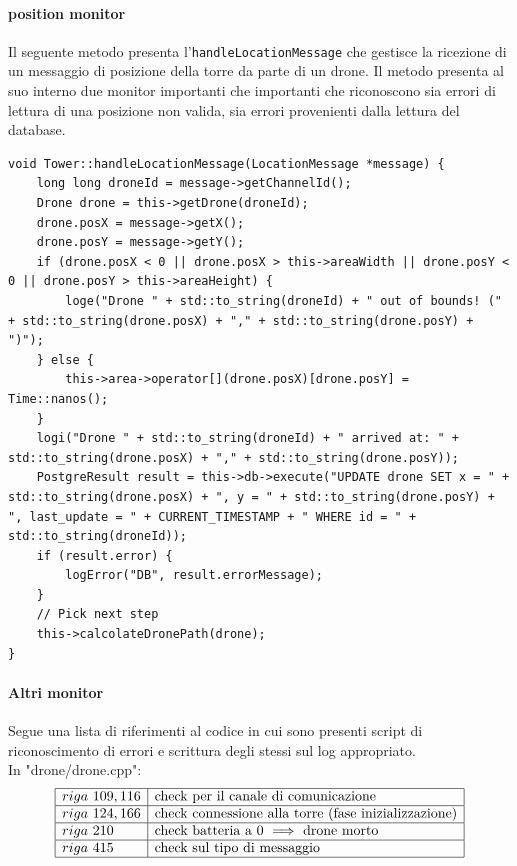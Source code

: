 \documentclass[a4paper, 11pt]{article}
\begin{document}
\paragraph*{position monitor} Il seguente metodo presenta l'\verb|handleLocationMessage| che gestisce la ricezione di un messaggio di posizione della torre da parte di un drone.
Il metodo presenta al suo interno due monitor importanti che importanti che riconoscono sia errori di lettura di una posizione non valida, sia errori provenienti dalla lettura del database.
\\
\begin{lstlisting}[style=customcpp, caption={da drone.cpp}]
void Tower::handleLocationMessage(LocationMessage *message) {
    long long droneId = message->getChannelId();
    Drone drone = this->getDrone(droneId);
    drone.posX = message->getX();
    drone.posY = message->getY();
    if (drone.posX < 0 || drone.posX > this->areaWidth || drone.posY < 0 || drone.posY > this->areaHeight) {
        loge("Drone " + std::to_string(droneId) + " out of bounds! (" + std::to_string(drone.posX) + "," + std::to_string(drone.posY) + ")");
    } else {
        this->area->operator[](drone.posX)[drone.posY] = Time::nanos();
    }
    logi("Drone " + std::to_string(droneId) + " arrived at: " + std::to_string(drone.posX) + "," + std::to_string(drone.posY));
    PostgreResult result = this->db->execute("UPDATE drone SET x = " + std::to_string(drone.posX) + ", y = " + std::to_string(drone.posY) + ", last_update = " + CURRENT_TIMESTAMP + " WHERE id = " + std::to_string(droneId));
    if (result.error) {
        logError("DB", result.errorMessage);
    }
    // Pick next step
    this->calcolateDronePath(drone);
}
\end{lstlisting}
\newpage
\paragraph*{Altri monitor} Segue una lista di riferimenti al codice in cui sono presenti script di riconoscimento di errori e scrittura degli stessi sul log appropriato.\\
In "drone/drone.cpp":
\[\begin{array}{|l|l|}
    \hline
    riga\ 109,116 & \text{check per il canale di comunicazione}\\
    \hline
    riga\ 124,166 & \text{check connessione alla torre (fase inizializzazione)}\\
    \hline
    riga\ 210 & \text{check batteria a 0 $\implies$ drone morto}\\
    \hline
    riga\ 415 & \text{check sul tipo di messaggio}\\
    \hline
\end{array}\]
\end{document}
